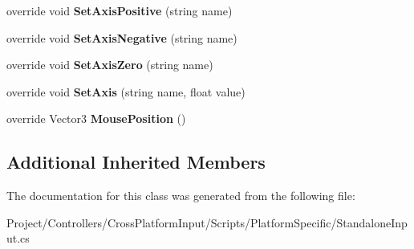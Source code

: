\begin{DoxyCompactItemize}
\item 
\mbox{\label{class_unity_standard_assets_1_1_cross_platform_input_1_1_platform_specific_1_1_standalone_input_a045d6d8118178037cca1552c087f4598}} 
override void {\bfseries Set\+Axis\+Positive} (string name)
\item 
\mbox{\label{class_unity_standard_assets_1_1_cross_platform_input_1_1_platform_specific_1_1_standalone_input_ab657b9df7411909f1319c7ecf918689c}} 
override void {\bfseries Set\+Axis\+Negative} (string name)
\item 
\mbox{\label{class_unity_standard_assets_1_1_cross_platform_input_1_1_platform_specific_1_1_standalone_input_a94bfadda9797a34c9d66b30dd6449c2c}} 
override void {\bfseries Set\+Axis\+Zero} (string name)
\item 
\mbox{\label{class_unity_standard_assets_1_1_cross_platform_input_1_1_platform_specific_1_1_standalone_input_a1597873a4a9309a388a3e9239e2632d7}} 
override void {\bfseries Set\+Axis} (string name, float value)
\item 
\mbox{\label{class_unity_standard_assets_1_1_cross_platform_input_1_1_platform_specific_1_1_standalone_input_a18dc43a362728639b76870ef6e141576}} 
override Vector3 {\bfseries Mouse\+Position} ()
\end{DoxyCompactItemize}
\subsection*{Additional Inherited Members}


The documentation for this class was generated from the following file\+:\begin{DoxyCompactItemize}
\item 
Project/\+Controllers/\+Cross\+Platform\+Input/\+Scripts/\+Platform\+Specific/Standalone\+Input.\+cs\end{DoxyCompactItemize}

